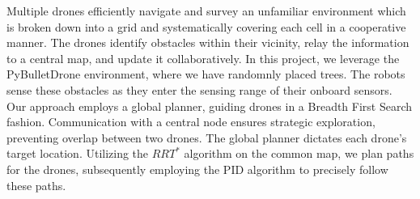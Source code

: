 Multiple drones efficiently navigate and survey an unfamiliar environment which is broken down into a grid and systematically covering each cell in a cooperative manner. The drones identify obstacles within their vicinity, relay the information to a central map, and update it collaboratively. In this project, we leverage the PyBulletDrone environment, where we have randomnly placed trees. The robots sense these obstacles as they enter the sensing range of their onboard sensors. Our approach employs a global planner, guiding drones in a Breadth First Search fashion. Communication with a central node ensures strategic exploration, preventing overlap between two drones. The global planner dictates each drone's target location. Utilizing the \(RRT^*\) algorithm on the common map, we plan paths for the drones, subsequently employing the PID algorithm to precisely follow these paths.
